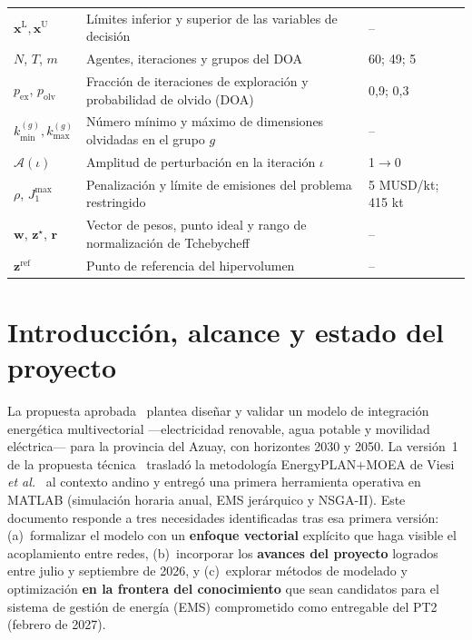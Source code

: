 \documentclass[11pt,a4paper]{article}
\newcommand{\vect}[1]{\bm{#1}}
\begin{document}
\begin{longtable}{L{2.6cm}L{8.6cm}L{3.0cm}}
$\vect{x}^{\mathrm{L}},\vect{x}^{\mathrm{U}}$ & L\'imites inferior y superior de las variables de decisi\'on & -- \\
$N$, $T$, $m$ & Agentes, iteraciones y grupos del DOA & 60; 49; 5 \\
$p_{\mathrm{ex}}$, $p_{\mathrm{olv}}$ & Fracci\'on de iteraciones de exploraci\'on y probabilidad de olvido (DOA) & 0,9; 0,3 \\
$k_{\min}^{(g)},k_{\max}^{(g)}$ & N\'umero m\'inimo y m\'aximo de dimensiones olvidadas en el grupo $g$ & -- \\
$\mathcal{A}(\iota)$ & Amplitud de perturbaci\'on en la iteraci\'on $\iota$ & 1$\to$0 \\
$\rho$, $J_1^{\max}$ & Penalizaci\'on y l\'imite de emisiones del problema restringido & 5 MUSD/kt; 415 kt \\
$\vect{w}$, $\vect{z}^{\star}$, $\vect{r}$ & Vector de pesos, punto ideal y rango de normalizaci\'on de Tchebycheff & -- \\
$\vect{z}^{\mathrm{ref}}$ & Punto de referencia del hipervolumen & -- \\
\end{longtable}

\section{Introducci\'on, alcance y estado del proyecto}
La propuesta aprobada~\cite{formulario2} plantea dise\~nar y validar un modelo de
integraci\'on energ\'etica multivectorial ---electricidad renovable, agua potable y
movilidad el\'ectrica--- para la provincia del Azuay, con horizontes 2030 y 2050. La
versi\'on~1 de la propuesta t\'ecnica~\cite{reporte_v1} traslad\'o la metodolog\'ia
EnergyPLAN$+$MOEA de Viesi \emph{et al.}~\cite{viesi2020} al contexto andino y entreg\'o
una primera herramienta operativa en MATLAB (simulaci\'on horaria anual, EMS jer\'arquico
y NSGA-II). Este documento responde a tres necesidades identificadas tras esa primera
versi\'on: (a)~formalizar el modelo con un \textbf{enfoque vectorial} expl\'icito
que haga visible el acoplamiento entre redes, (b)~incorporar los \textbf{avances del
proyecto} logrados entre julio y septiembre de 2026, y (c)~explorar m\'etodos de
modelado y optimizaci\'on \textbf{en la frontera del conocimiento} que sean candidatos
para el sistema de gesti\'on de energ\'ia (EMS) comprometido como entregable del PT2
(febrero de 2027).
\end{document}
